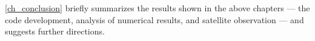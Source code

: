 \cref{ch_conclusion} briefly summarizes the results shown in the above chapters --- the code development, analysis of numerical results, and satellite observation --- and suggests further directions. 












